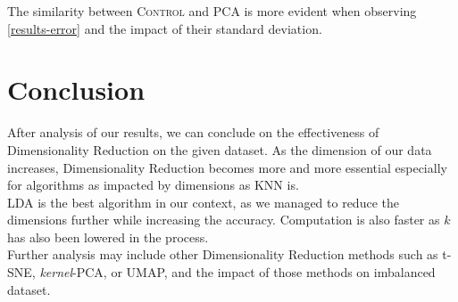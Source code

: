 The similarity between \textsc{Control} and \textsc{PCA} is more evident when observing \cref{results-error} and the impact of their standard deviation.


\newpage
	\section{Conclusion}
	After analysis of our results, we can conclude on the effectiveness of Dimensionality Reduction on the given dataset. As the dimension of our data increases, Dimensionality Reduction becomes more and more essential especially for algorithms as impacted by dimensions as KNN is.\\
	LDA is the best algorithm in our context, as we managed to reduce the dimensions further while increasing the accuracy. Computation is also faster as $k$ has also been lowered in the process.\\
	Further analysis may include other Dimensionality Reduction methods such as t-SNE, \textit{kernel}-PCA, or
	UMAP, and the impact of those methods on imbalanced dataset.
	



		
	
	
	
	



